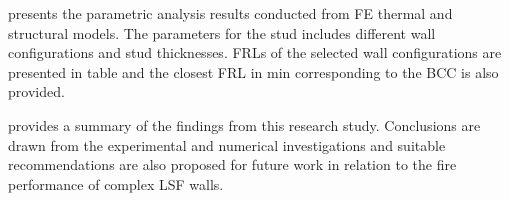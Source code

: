 \textbf{} presents the parametric analysis results conducted from FE thermal and structural models. The parameters for the stud includes different wall configurations and stud thicknesses. FRLs of the selected wall configurations are presented in table and the closest FRL in min corresponding to the BCC is also provided. 


\textbf{} provides a summary of the findings from this research study. Conclusions are drawn from the experimental and numerical investigations and suitable recommendations are also proposed for future work in relation to the fire performance of complex LSF walls.


